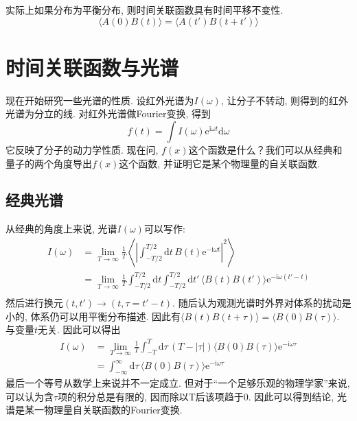     实际上如果分布为平衡分布, 则时间关联函数具有时间平移不变性. 
    \begin{equation}
        \langle A(0)B(t) \rangle = \langle A(t')B(t+t') \rangle
    \end{equation}

    \section{时间关联函数与光谱}

    现在开始研究一些光谱的性质. 设红外光谱为$I(\omega)$, 让分子不转动, 则得到的红外光谱为分立的线. 对红外光谱做Fourier变换, 得到
    \begin{equation}
        f(t) = \int I(\omega)\mathrm{e}^{\mathrm{i}\omega t}\mathrm{d}\omega 
    \end{equation}
    它反映了分子的动力学性质. 现在问, $f(x)$这个函数是什么？我们可以从经典和量子的两个角度导出$f(x)$这个函数, 并证明它是某个物理量的自关联函数. 

    \subsection{经典光谱}

    从经典的角度上来说, 光谱$I(\omega)$可以写作:
    \begin{equation}\begin{aligned}
        I(\omega) 
        &= \lim_{T\to\infty} \frac 1T \left\langle \left| \int_{-T/2}^{T/2} \mathrm{d}t\, B(t) \mathrm{e}^{-\mathrm{i}\omega t} \right|^2 \right\rangle \\
        &= \lim_{T\to\infty} \frac 1T \int_{-T/2}^{T/2} \mathrm{d}t \int_{-T/2}^{T/2} \mathrm{d}t'\, \langle B(t)B(t') \rangle \mathrm{e}^{-\mathrm{i}\omega (t'-t)} \\
    \end{aligned}\end{equation}
    然后进行换元$(t,t')\to(t, \tau=t'-t)$. 随后认为观测光谱时外界对体系的扰动是小的, 体系仍可以用平衡分布描述. 因此有$\langle B(t)B(t+\tau) \rangle = \langle B(0)B(\tau) \rangle$. 与变量$t$无关. 因此可以得出
    \begin{equation}\begin{aligned}
        I(\omega) 
        &= \lim_{T\to\infty} \frac 1T \int_{-T}^{T} \mathrm{d}\tau\, (T - |\tau|) \langle B(0)B(\tau) \rangle \mathrm{e}^{-\mathrm{i}\omega \tau} \\
        &= \int_{-\infty}^{\infty} \mathrm{d}\tau\, \langle B(0)B(\tau) \rangle \mathrm{e}^{-\mathrm{i}\omega \tau}
    \end{aligned}\end{equation}
    最后一个等号从数学上来说并不一定成立. 但对于“一个足够乐观的物理学家”来说, 可以认为含$\tau$项的积分总是有限的, 因而除以T后该项趋于0. 因此可以得到结论, 光谱是某一物理量自关联函数的Fourier变换.

